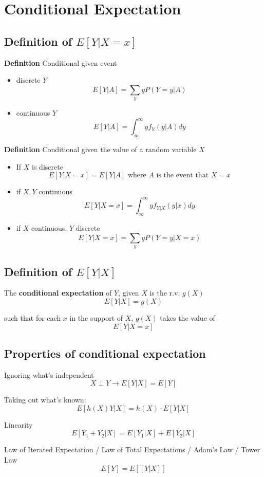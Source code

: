 \chapter{Conditional Expectation}

\section{Definition of $E\left[ Y |X = x \right] $}
\begin{framed}
   \textbf{Definition} Conditional given event
   \begin{itemize}
      \item discrete $Y$ 
         \[
            E[Y |A ] = \sum_{y} y P(Y = y |A)
         \] 
      \item continuous $Y$ 
         \[
            E[Y |A ] = \int_{\infty}^{\infty} yf_Y(y | A) dy  
         \] 
   \end{itemize}

   \textbf{Definition} Conditional given the value of a random variable $X$
   \begin{itemize}
      \item If $X$ is discrete
         \[
            E[Y |X = x ] = E[Y |A] \text{ where $A$ is the event that $X = x$}
         \] 
      \item if $X, Y$ continuous
         \[
            E[Y |X = x ] = \int_{\infty}^{\infty} yf_{Y|X}(y | x) dy  
         \] 
      \item if $X$ continuous, $Y$ discrete
         \[
            E[Y |X = x ] = \sum_{y } y P(Y = y | X = x) 
         \] 
   \end{itemize}
\end{framed}

\section{Definition of $E\left[ Y | X\right] $}
\begin{framed}

   The \textbf{conditional expectation} of $Y$, given $X$ is the r.v. $g(X)$
    \[
       E[Y | X] = g(X)
   \] 

   such that for each $x$ in the support of  $X$, $g(X)$ takes the value of 
   \[
     E\left[ Y | X = x\right] 
   \] 
\end{framed}


\section{Properties of conditional expectation}
\begin{framed}
   Ignoring what's independent
   \[
      X \perp Y \rightarrow E[Y |X] = E[Y]
   \] 

   Taking out what's known: 
   \[
      E[h(X) Y |X] = h(X) \cdot E[Y |X]
   \] 

   Linearity
   \[
      E[Y_1 + Y_2 | X] = E[Y_1 | X] + E[Y_2 | X]
   \] 

   Law of Iterated Expectation / Law of Total Expectations / Adam's Law / Tower Law 
   \[
      E[Y] = E\left[[Y  |X] \right]
   \] 
\end{framed}


